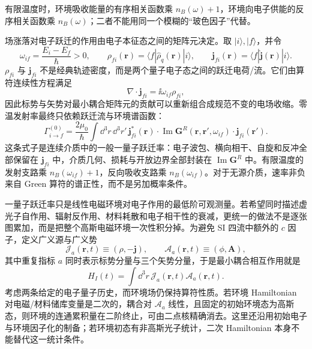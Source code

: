 有限温度时，环境吸收能量的有序相关函数乘 $n_B(\omega)+1$，环境向电子供能的反序相关函数乘 $n_B(\omega)$；二者不能用同一个模糊的“玻色因子”代替。

场涨落对电子跃迁的作用由电子本征态之间的矩阵元决定。取 $|i\rangle,|f\rangle$，并令
\[
\omega_{if}=\frac{E_i-E_f}{\hbar}>0,
\qquad
\rho_{fi}(\mathbf r)=\langle f|\hat\rho_q(\mathbf r)|i\rangle,
\qquad
\mathbf j_{fi}(\mathbf r)=\langle f|\hat{\mathbf j}(\mathbf r)|i\rangle.
\]
$\rho_{fi}$ 与 $\mathbf j_{fi}$ 不是经典轨迹密度，而是两个量子电子态之间的跃迁电荷/流。它们由算符连续性方程满足
\[
\nabla\cdot\mathbf j_{fi}=\ii\omega_{if}\rho_{fi},
\]
因此标势与矢势对最小耦合矩阵元的贡献可以重新组合成规范不变的电场收缩。零温发射率最终只依赖跃迁流与环境谱函数：
\begin{equation}
\boxed{
\Gamma_{i\to f}^{(0)}
=
\frac{2\mu_0}{\hbar}
\int\dd^3 r\,\dd^3 r'\,
\mathbf j_{fi}^{*}(\mathbf r)\cdot
\operatorname{Im}\mathbf G^R(\mathbf r,\mathbf r',\omega_{if})\cdot
\mathbf j_{fi}(\mathbf r').}
\label{eq:quantum_transition_current_green_rate}
\end{equation}
这条式子是连续介质中的一般一量子跃迁率：电子波包、横向相干、自旋和反冲全部保留在 $\mathbf j_{fi}$ 中，介质几何、损耗与开放边界全部封装在 $\operatorname{Im}\mathbf G^R$ 中。有限温度的发射支路乘 $n_B(\omega_{if})+1$，反向吸收支路乘 $n_B(\omega_{if})$。对于无源介质，速率非负来自 Green 算符的谱正性，而不是另加概率条件。

一量子跃迁率只是线性电磁环境对电子作用的最低阶可观测量。若希望同时描述虚光子自作用、辐射反作用、材料耗散和电子相干性的衰减，更统一的做法不是逐张图累加，而是把整个高斯电磁环境一次性积分掉。为避免 SI 四流中额外的 $c$ 因子，定义广义源与广义势
\[
\mathcal J_a(\mathbf r,t)
\equiv(\rho, -\mathbf j),
\qquad
\mathcal A_a(\mathbf r,t)
\equiv(\phi,\mathbf A),
\]
其中重复指标 $a$ 同时表示标势分量与三个矢势分量，于是最小耦合相互作用就是
\begin{equation}
\boxed{
H_I(t)
=\int\dd^3r\,
\mathcal J_a(\mathbf r,t)\mathcal A_a(\mathbf r,t).}
\label{eq:em_linear_environment_interaction}
\end{equation}
考虑两条给定的电子量子历史，而环境场仍保持算符性质。若环境 Hamiltonian 对电磁/材料储库变量是二次的，耦合对 $\mathcal A_a$ 线性，且固定的初始环境态为高斯态，则环境的连通累积量在二阶终止，可由二点核精确消去\cite{FeynmanVernon1963,ScheelBuhmann2008MacQED}。这里还沿用初始电子与环境因子化的制备；若环境初态有非高斯光子统计，二次 Hamiltonian 本身不能替代这一统计条件。

